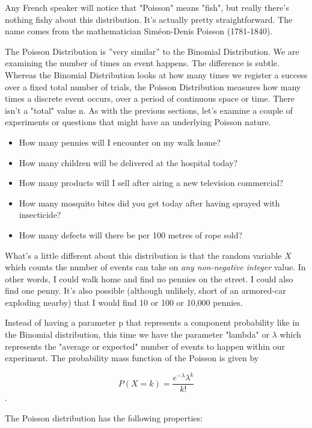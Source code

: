 Any French speaker will notice that "Poisson" means "fish", but really there's nothing fishy about this distribution. It's actually pretty straightforward. The name comes from the mathematician Siméon-Denis Poisson (1781-1840).

The Poisson Distribution is ''very similar'' to the Binomial Distribution. We are examining the number of times an event happens. The difference is subtle. Whereas the Binomial Distribution looks at how many times we register a success over a fixed total number of trials, the Poisson Distribution measures how many times a discrete event occurs, over a period of continuous space or time. There isn't a "total" value n. As with the previous sections, let's examine a couple of experiments or questions that might have an underlying Poisson nature.

\begin{itemize}
  \item How many pennies will I encounter on my walk home?
  \item How many children will be delivered at the hospital today?
  \item How many products will I sell after airing a new television commercial?
  \item How many mosquito bites did you get today after having sprayed with insecticide?
  \item How many defects will there be per 100 metres of rope sold?
\end{itemize}

What's a little different about this distribution is that the random variable $X$ which counts the number of events can take on \emph{any non-negative integer} value. In other words, I could walk home and find no pennies on the street. I could also find one penny. It's also possible (although unlikely, short of an armored-car exploding nearby) that I would find 10 or 100 or 10,000 pennies.

Instead of having a parameter p that represents a component probability like in the Binomial distribution, this time we have the parameter "lambda" or $\lambda$ which represents the "average or expected" number of events to happen within our experiment. The probability mass function of the Poisson is given by

\begin{equation}
  P(X=k)=\frac{e^{-\lambda}\lambda^k}{k!}
\end{equation}.

The Poisson distribution has the following properties:

